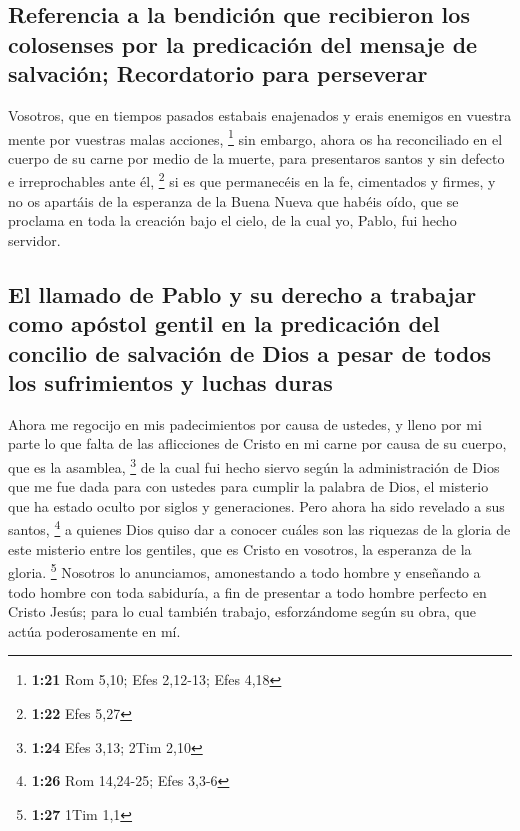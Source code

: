 \hypertarget{referencia-a-la-bendiciuxf3n-que-recibieron-los-colosenses-por-la-predicaciuxf3n-del-mensaje-de-salvaciuxf3n-recordatorio-para-perseverar}{%
\subsection{Referencia a la bendición que recibieron los colosenses por
la predicación del mensaje de salvación; Recordatorio para
perseverar}\label{referencia-a-la-bendiciuxf3n-que-recibieron-los-colosenses-por-la-predicaciuxf3n-del-mensaje-de-salvaciuxf3n-recordatorio-para-perseverar}}

 Vosotros, que en tiempos pasados estabais enajenados y
erais enemigos en vuestra mente por vuestras malas acciones, \footnote{\textbf{1:21}
  Rom 5,10; Efes 2,12-13; Efes 4,18}  sin embargo, ahora
os ha reconciliado en el cuerpo de su carne por medio de la muerte, para
presentaros santos y sin defecto e irreprochables ante él, \footnote{\textbf{1:22}
  Efes 5,27}  si es que permanecéis en la fe, cimentados
y firmes, y no os apartáis de la esperanza de la Buena Nueva que habéis
oído, que se proclama en toda la creación bajo el cielo, de la cual yo,
Pablo, fui hecho servidor.

\hypertarget{el-llamado-de-pablo-y-su-derecho-a-trabajar-como-apuxf3stol-gentil-en-la-predicaciuxf3n-del-concilio-de-salvaciuxf3n-de-dios-a-pesar-de-todos-los-sufrimientos-y-luchas-duras}{%
\subsection{El llamado de Pablo y su derecho a trabajar como apóstol
gentil en la predicación del concilio de salvación de Dios a pesar de
todos los sufrimientos y luchas
duras}\label{el-llamado-de-pablo-y-su-derecho-a-trabajar-como-apuxf3stol-gentil-en-la-predicaciuxf3n-del-concilio-de-salvaciuxf3n-de-dios-a-pesar-de-todos-los-sufrimientos-y-luchas-duras}}

 Ahora me regocijo en mis padecimientos por causa de
ustedes, y lleno por mi parte lo que falta de las aflicciones de Cristo
en mi carne por causa de su cuerpo, que es la asamblea, \footnote{\textbf{1:24}
  Efes 3,13; 2Tim 2,10}  de la cual fui hecho siervo
según la administración de Dios que me fue dada para con ustedes para
cumplir la palabra de Dios,  el misterio que ha estado
oculto por siglos y generaciones. Pero ahora ha sido revelado a sus
santos, \footnote{\textbf{1:26} Rom 14,24-25; Efes 3,3-6}
 a quienes Dios quiso dar a conocer cuáles son las
riquezas de la gloria de este misterio entre los gentiles, que es Cristo
en vosotros, la esperanza de la gloria. \footnote{\textbf{1:27} 1Tim 1,1}
 Nosotros lo anunciamos, amonestando a todo hombre y
enseñando a todo hombre con toda sabiduría, a fin de presentar a todo
hombre perfecto en Cristo Jesús;  para lo cual también
trabajo, esforzándome según su obra, que actúa poderosamente en mí.

